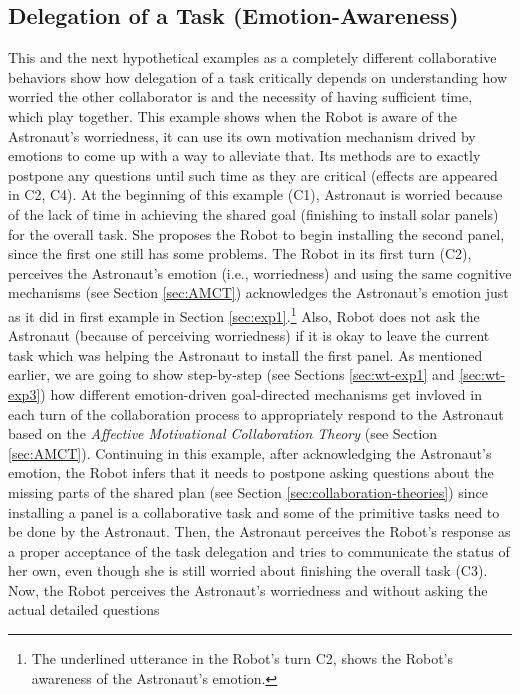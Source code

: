 \subsection{Delegation of a Task (Emotion-Awareness)}
\label{sec:exp3}

This and the next hypothetical examples as a completely different collaborative
behaviors show how delegation of a task critically depends on understanding how
worried the other collaborator is and the necessity of having sufficient time,
which play together. This example shows when the Robot is aware of the
Astronaut's worriedness, it can use its own motivation mechanism drived by
emotions to come up with a way to alleviate that. Its methods are to exactly
postpone any questions until such time as they are critical (effects are
appeared in C2, C4). At the beginning of this example (C1), Astronaut is worried
because of the lack of time in achieving the shared goal (finishing to install
solar panels) for the overall task. She proposes the Robot to begin installing
the second panel, since the first one still has some problems. The Robot in its
first turn (C2), perceives the Astronaut's emotion (i.e., worriedness) and using
the same cognitive mechanisms (see Section \ref{sec:AMCT}) acknowledges the
Astronaut's emotion just as it did in first example in Section
\ref{sec:exp1}.\footnote{The underlined utterance in the Robot's turn C2, shows
the Robot's awareness of the Astronaut's emotion.} Also, Robot does not ask the
Astronaut (because of perceiving worriedness) if it is okay to leave the current
task which was helping the Astronaut to install the first panel. As mentioned
earlier, we are going to show step-by-step (see Sections \ref{sec:wt-exp1} and
\ref{sec:wt-exp3}) how different emotion-driven goal-directed mechanisms get
invloved in each turn of the collaboration process to appropriately respond to
the Astronaut based on the \textit{Affective Motivational Collaboration Theory}
(see Section \ref{sec:AMCT}). Continuing in this example, after acknowledging
the Astronaut's emotion, the Robot infers that it needs to postpone asking
questions about the missing parts of the shared plan (see Section
\ref{sec:collaboration-theories}) since installing a panel is a collaborative
task and some of the primitive tasks need to be done by the Astronaut. Then, the
Astronaut perceives the Robot's response as a proper acceptance of the task
delegation and tries to communicate the status of her own, even though she is
still worried about finishing the overall task (C3). Now, the Robot perceives
the Astronaut's worriedness and without asking the actual detailed questions
